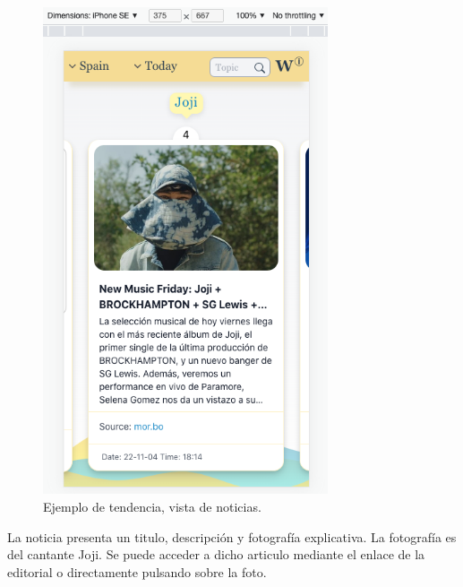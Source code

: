 \begin{figure}[H]
    \centering
    \myfloatalign
    \includegraphics[width=0.75\textwidth]{gfx/ejemplo5.png}
    \caption[Ejemplo de tendencia, vista de noticias]{Ejemplo de tendencia, vista de noticias.}\label{gfx:ejemplo5}
\end{figure}

La noticia presenta un titulo, descripción y fotografía explicativa. La fotografía es del cantante Joji. Se puede acceder a dicho articulo mediante el enlace de la editorial o directamente pulsando sobre la foto.

